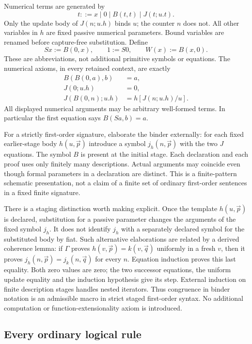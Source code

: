 \documentclass[11pt]{article}
\theoremstyle{definition}
\begin{document}
Numerical terms are generated by
\[
 t ::= x\mid 0\mid B(t,t)\mid J(t;u.t).
\]
Only the update body of $J(n;u.h)$ binds $u$; the counter $n$ does not.
All other variables in $h$ are fixed passive numerical parameters.
Bound variables are renamed before capture-free substitution. Define
\[
 Sx:=B(0,x),\qquad 1:=S0,\qquad W(x):=B(x,0).
\]
These are abbreviations, not additional primitive symbols or equations.
The numerical axioms, in every retained context, are exactly
\begin{align}
 B(B(0,a),b)&=a,\tag{B}\label{ax:B}\\
 J(0;u.h)&=0,\tag{J0}\label{ax:J0}\\
 J(B(0,n);u.h)&=h[J(n;u.h)/u].\tag{JS}\label{ax:JS}
\end{align}
All displayed numerical arguments may be arbitrary well-formed terms.
In particular the first equation says $B(Sa,b)=a$.

For a strictly first-order signature, elaborate the binder externally:
for each fixed earlier-stage body $h(u,\vec p)$ introduce a symbol
$j_h(n,\vec p)$ with the two $J$ equations. The symbol $B$ is present
at the initial stage. Each declaration and each proof uses only finitely
many descriptions. Actual arguments may coincide even though formal
parameters in a declaration are distinct. This is a finite-pattern
schematic presentation, not a claim of a finite set of ordinary
first-order sentences in a fixed finite signature.

There is a staging distinction worth making explicit. Once the template
$h(u,\vec p)$ is declared, substitution for a passive parameter changes
the arguments of the fixed symbol $j_h$. It does not identify $j_h$
with a separately declared symbol for the substituted body by fiat.
Such alternative elaborations are related by a derived coherence lemma:
if $\Gamma$ proves $h(v,\vec p)=k(v,\vec q)$ uniformly in a fresh
$v$, then it proves $j_h(n,\vec p)=j_k(n,\vec q)$ for every $n$.
Equation induction proves this last equality. Both zero values are zero;
the two successor equations, the uniform update equality and the induction
hypothesis give its step. External induction on finite description stages
handles nested iterators. Thus congruence in binder notation is an
admissible macro in strict staged first-order syntax. No additional
computation or function-extensionality axiom is introduced.

\subsection{Every ordinary logical rule}
\end{document}
